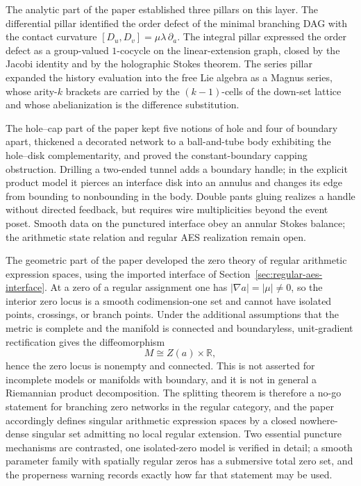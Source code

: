 The analytic part of the paper established three pillars on this layer.  The
differential pillar identified the order defect of the minimal branching DAG with
the contact curvature $[D_u,D_v]=\mu\lambda\,\partial_a$.  The integral pillar
expressed the order defect as a group-valued $1$-cocycle on the linear-extension
graph, closed by the Jacobi identity and by the holographic Stokes theorem.  The
series pillar expanded the history evaluation into the free Lie algebra as a
Magnus series, whose arity-$k$ brackets are carried by the $(k-1)$-cells of the
down-set lattice and whose abelianization is the difference substitution.

The hole--cap part of the paper kept five notions of hole and four of boundary
apart, thickened a decorated network to a ball-and-tube body exhibiting the
hole--disk complementarity, and proved the constant-boundary capping obstruction.
Drilling a two-ended tunnel adds a boundary handle; in the explicit product
model it pierces an interface disk into an annulus and changes its edge from
bounding to nonbounding in the body.  Double pants gluing realizes a handle
without directed feedback, but requires wire multiplicities beyond the event
poset.  Smooth data on the punctured interface obey an annular Stokes balance;
the arithmetic state relation and regular AES realization remain open.

The geometric part of the paper developed the zero theory of regular arithmetic
expression spaces, using the imported interface of
Section~\ref{sec:regular-aes-interface}.  At a zero of a regular assignment one
has $|\nabla a|=|\mu|\ne0$, so the interior zero locus is a smooth
codimension-one set and cannot have isolated points, crossings, or branch
points.  Under the additional assumptions that the metric is complete and the
manifold is connected and boundaryless, unit-gradient rectification gives the
diffeomorphism
\[
  M\cong Z(a)\times\mathbb R ,
\]
hence the zero locus is nonempty and connected.  This is not asserted for
incomplete models or manifolds with boundary, and it is not in general a
Riemannian product decomposition.  The splitting theorem is therefore a no-go
statement for branching zero networks in the regular category, and the paper
accordingly defines singular arithmetic expression spaces by a closed
nowhere-dense singular set admitting no local regular extension.  Two essential
puncture mechanisms are contrasted, one isolated-zero model is verified in
detail; a smooth parameter family with spatially regular zeros has a submersive
total zero set, and the properness warning records exactly how far that
statement may be used.

